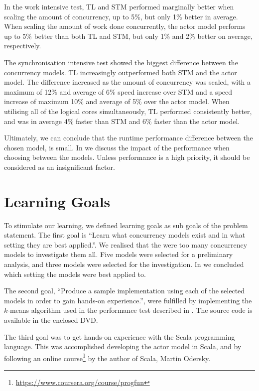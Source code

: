 In the work intensive test, \ac{TL} and \ac{STM} performed marginally better when scaling the amount of concurrency, up to 5\%, but only 1\% better in average. When scaling the amount of work done concurrently, the actor model performs up to 5\% better than both \ac{TL} and \ac{STM}, but only 1\% and 2\% better on average, respectively.

The synchronisation intensive test showed the biggest difference between the concurrency models. \ac{TL} increasingly outperformed both \ac{STM} and the actor model. The difference increased as the amount of concurrency was scaled, with a maximum of 12\% and average of 6\% speed increase over \ac{STM} and a speed increase of maximum 10\% and average of 5\% over the actor model. When utilising all of the logical cores simultaneously, \ac{TL} performed consistently better, and was in average 4\% faster than \ac{STM} and 6\% faster than the actor model.

Ultimately, we can conclude that the runtime performance difference between the chosen model, is small. In  we discuss the impact of the performance when choosing between the models. Unless performance is a high priority, it should be considered as an insignificant factor.

\section{Learning Goals}
To stimulate our learning, we defined learning goals as sub goals of the problem statement. The first goal is ``Learn what concurrency models exist and in what setting they are best applied.''. We realised that the were too many concurrency models to investigate them all. Five models were selected for a preliminary analysis, and three models were selected for the investigation. In  we concluded which setting the models were best applied to.

The second goal, ``Produce a sample implementation using each of the selected models in order to gain hands-on experience.'', were fulfilled by implementing the $k$-means algorithm used in the performance test described in . The source code is available in the enclosed DVD. 

The third goal was to get hands-on experience with the Scala programming language. This was accomplished developing the actor model in Scala, and by following an online course\footnote{\url{https://www.coursera.org/course/progfun}} by the author of Scala, Martin Odersky.
\worksheetend